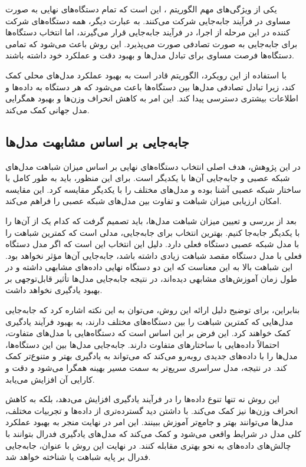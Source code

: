 یکی از ویژگی‌های مهم الگوریتم
%
، این است که تمام دستگاه‌های نهایی به صورت مساوی در فرآیند جابه‌جایی شرکت می‌کنند. به عبارت دیگر، همه دستگاه‌های شرکت کننده در این مرحله از اجرا، در فرآیند جابه‌جایی قرار می‌گیرند، اما انتخاب دستگاه‌ها برای جابه‌جایی به صورت تصادفی صورت می‌پذیرد. این روش باعث می‌شود که تمامی دستگاه‌ها فرصت مساوی برای تبادل مدل‌ها و بهبود دقت و عملکرد خود داشته باشند.

با استفاده از این رویکرد، الگوریتم
قادر است به بهبود عملکرد مدل‌های محلی کمک کند، زیرا تبادل تصادفی مدل‌ها بین دستگاه‌ها باعث می‌شود که هر دستگاه به داده‌ها و اطلاعات بیشتری دسترسی پیدا کند. این امر به کاهش انحراف وزن‌ها و بهبود همگرایی مدل جهانی کمک می‌کند.


\subsection{جابه‌جایی بر اساس مشابهت مدل‌ها}
در این پژوهش، هدف اصلی انتخاب دستگاه‌های نهایی بر اساس میزان شباهت مدل‌های شبکه عصبی و جابه‌جایی آن‌ها با یکدیگر است. برای این منظور، باید به طور کامل با ساختار شبکه عصبی آشنا بوده و مدل‌های مختلف را با یکدیگر مقایسه کرد. این مقایسه امکان ارزیابی میزان شباهت و تفاوت بین مدل‌های شبکه عصبی را فراهم می‌کند.

بعد از بررسی و تعیین میزان شباهت مدل‌ها، باید تصمیم گرفت که کدام یک از آن‌ها را با یکدیگر جابه‌جا کنیم. بهترین انتخاب برای جابه‌جایی، مدلی است که کمترین شباهت را با مدل شبکه عصبی دستگاه فعلی دارد. دلیل این انتخاب این است که اگر مدل دستگاه فعلی با مدل دستگاه مقصد شباهت زیادی داشته باشد، جابه‌جایی آن‌ها مؤثر نخواهد بود. این شباهت بالا به این معناست که این دو دستگاه نهایی داده‌های مشابهی داشته و در طول زمان آموزش‌های مشابهی دیده‌اند، در نتیجه جابه‌جایی مدل‌ها تأثیر قابل‌توجهی بر بهبود یادگیری نخواهد داشت.

بنابراین، برای توضیح دلیل ارائه این روش، می‌توان به این نکته اشاره کرد که جابه‌جایی مدل‌هایی که کمترین شباهت را بین دستگاه‌های مختلف دارند، به بهبود فرآیند یادگیری کمک خواهند کرد. این فرض بر این اساس است که دستگاه‌هایی با مدل‌های متفاوت، احتمالاً داده‌هایی با ساختارهای متفاوت دارند. جابه‌جایی مدل‌ها بین این دستگاه‌ها، مدل‌ها را با داده‌های جدیدی روبه‌رو می‌کند که می‌تواند به یادگیری بهتر و متنوع‌تر کمک کند. در نتیجه، مدل سراسری سریع‌تر به سمت مسیر بهینه همگرا می‌شود و دقت و کارایی آن افزایش می‌یابد.

این روش نه تنها تنوع داده‌ها را در فرآیند یادگیری افزایش می‌دهد، بلکه به کاهش انحراف وزن‌ها نیز کمک می‌کند. با داشتن دید گسترده‌تری از داده‌ها و تجربیات مختلف، مدل‌ها می‌توانند بهتر و جامع‌تر آموزش ببینند. این امر در نهایت منجر به بهبود عملکرد کلی مدل در شرایط واقعی می‌شود و کمک می‌کند که مدل‌های یادگیری فدرال بتوانند با چالش‌های داده‌های
به نحو بهتری مقابله کنند.
در نهایت این روش با عنوان، جابه‌جایی فدرال بر پایه شباهت%
یا 
شناخته خواهد شد.


